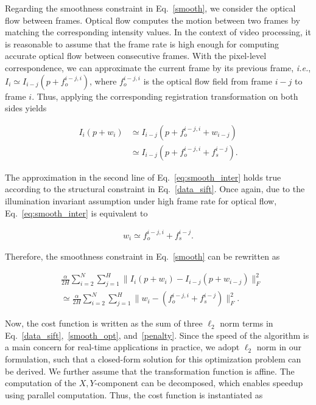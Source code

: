 \documentclass[review]{elsarticle}
\begin{document}
Regarding the smoothness constraint in Eq.~\eqref{smooth}, we consider the optical flow between frames. Optical flow computes the motion between two frames by matching the corresponding intensity values. In the context of video processing, it is reasonable to assume that the frame rate is high enough for computing accurate optical flow between consecutive frames. With the pixel-level correspondence, we can approximate the current frame by its previous frame, \textit{i.e.}, $I_i\simeq I_{i-j}(p+f_o^{i-j,i})$, where $f_o^{i-j,i}$ is the optical flow field from frame $i-j$ to frame $i$. Thus, applying the corresponding registration transformation on both sides yields

\begin{equation}
\begin{aligned}
\label{eq:smooth_inter}
I_i(p+w_i)& \simeq I_{i-j}(p+f_o^{i-j,i}+w_{i-j}) \\
& \simeq I_{i-j}(p+f_o^{i-j,i}+f_s^{i-j}).
\end{aligned}
\end{equation}

The approximation in the second line of Eq.~\eqref{eq:smooth_inter} holds true according to the structural constraint in Eq.~\eqref{data_sift}. Once again, due to the illumination invariant assumption under high frame rate for optical flow, Eq.~\eqref{eq:smooth_inter} is equivalent to

\begin{equation}
\begin{aligned}
w_i \simeq f_o^{i-j,i}+f_s^{i-j}.
\end{aligned}
\end{equation}

Therefore, the smoothness constraint in Eq.~\eqref{smooth} can be rewritten as

\begin{equation}
\begin{aligned}
\label{smooth_opt}
&\frac{\alpha}{2H}\sum_{i=2}^{N}\sum_{j=1}^{H}\parallel{I_i(p+w_i)-I_{i-j}(p+w_{i-j})}\parallel_F^2 \\
&\simeq\frac{\alpha}{2H}\sum_{i=2}^{N}\sum_{j=1}^{H}\parallel{w_i-(f_o^{i-j,i}+f_s^{i-j})}\parallel_F^2.
\end{aligned}
\end{equation}


Now, the cost function is written as the sum of three $\ell_2$ norm terms in Eq.~\eqref{data_sift},~\eqref{smooth_opt}, and~\eqref{penalty}. Since the speed of the algorithm is a main concern for real-time applications in practice, we adopt $\ell_2$ norm in our formulation, such that a closed-form solution for this optimization problem can be derived. We further assume that the transformation function is affine. The computation of the $X,Y$-component can be decomposed, which enables speedup using parallel computation. Thus, the cost function is instantiated as
\end{document}
